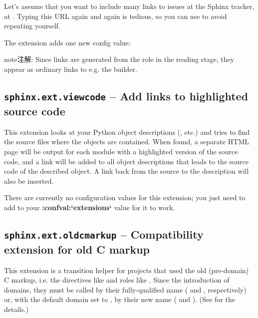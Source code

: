 \documentclass[letterpaper,10pt,english]{sphinxmanual}
\begin{document}
Let's assume that you want to include many links to issues at the Sphinx
tracker, at .  Typing
this URL again and again is tedious, so you can use {\hyperref[ext/extlinks:module\string-sphinx.ext.extlinks]{}}
to avoid repeating yourself.

The extension adds one new config value:

\begin{notice}{note}{注解:}
Since links are generated from the role in the reading stage, they appear as
ordinary links to e.g. the  builder.
\end{notice}


\subsection{\texttt{sphinx.ext.viewcode} -- Add links to highlighted source code}
\label{ext/viewcode::doc}\label{ext/viewcode:sphinx-ext-viewcode-add-links-to-highlighted-source-code}\label{ext/viewcode:module-sphinx.ext.viewcode}

This extension looks at your Python object descriptions (,
 etc.) and tries to find the source files where the objects are
contained.  When found, a separate HTML page will be output for each module with
a highlighted version of the source code, and a link will be added to all object
descriptions that leads to the source code of the described object.  A link back
from the source to the description will also be inserted.

There are currently no configuration values for this extension; you just need to
add  to your {\color{red}\bfseries{}:confval:{}`extensions{}`} value for it to work.


\subsection{\texttt{sphinx.ext.oldcmarkup} -- Compatibility extension for old C markup}
\label{ext/oldcmarkup::doc}\label{ext/oldcmarkup:sphinx-ext-oldcmarkup-compatibility-extension-for-old-c-markup}\label{ext/oldcmarkup:module-sphinx.ext.oldcmarkup}

This extension is a transition helper for projects that used the old
(pre-domain) C markup, i.e. the directives like  and roles like
.  Since the introduction of domains, they must be called by their
fully-qualified name ( and , respectively) or, with the
default domain set to , by their new name ( and ).
(See {\hyperref[domains:c\string-domain]{}} for the details.)
\end{document}
